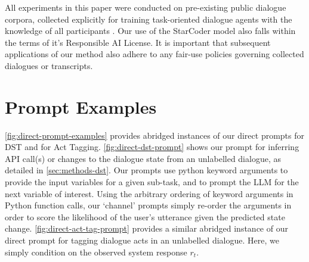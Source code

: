 \documentclass[11pt]{article}
\newcommand{\bdk}[1]{}
\begin{document}
All experiments in this paper were conducted on pre-existing public dialogue corpora, collected explicitly for training task-oriented dialogue agents with the knowledge of all participants \cite{budzianowski2018large}. 
Our use of the StarCoder model also falls within the terms of it's Responsible AI License.
It is important that subsequent applications of our method also adhere to any fair-use policies governing collected dialogues or transcripts.

\bdk{Points to discuss: fair access and use of unlabelled dialogues}



\appendix
\section{Prompt Examples}
\label{app:prompt-examples}
\autoref{fig:direct-prompt-examples} provides abridged instances of our direct prompts for DST and for Act Tagging. \autoref{fig:direct-dst-prompt} shows our prompt for inferring API call(s) or changes to the dialogue state from an unlabelled dialogue, as detailed in \autoref{sec:methods-dst}. Our prompts use python keyword arguments to provide the input variables for a given sub-task, and to prompt the LLM for the next variable of interest. Using the arbitrary ordering of keyword arguments in Python function calls, our `channel' prompts simply re-order the arguments in order to score the likelihood of the user's utterance given the predicted state change.
\autoref{fig:direct-act-tag-prompt} provides a similar abridged instance of our direct prompt for tagging dialogue acts in an unlabelled dialogue. Here, we simply condition on the observed system response $r_t$.
\end{document}
